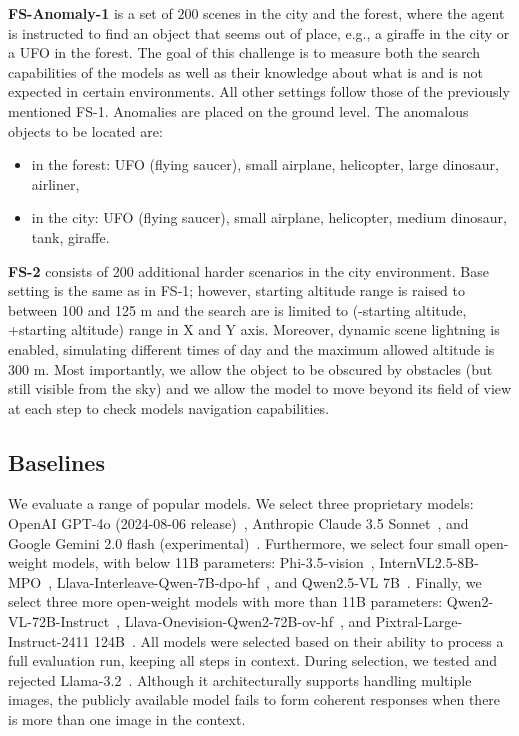 \documentclass{article}
\theoremstyle{plain}
\theoremstyle{definition}
\theoremstyle{remark}
\newcommand{\challenge}{FS-1}
\newcommand{\anomalychallenge}{FS-Anomaly-1}
\newcommand{\hardchallenge}{FS-2}
\begin{document}
\textbf{\anomalychallenge{}} is a set of $200$ scenes in the city and the forest, where the agent is instructed to find an object that seems out of place, e.g., a giraffe in the city or a UFO in the forest. The goal of this challenge is to measure both the search capabilities of the models as well as their knowledge about what is and is not expected in certain environments. All other settings follow those of the previously mentioned \challenge{}. Anomalies are placed on the ground level. The anomalous objects to be located are:
\begin{itemize}[noitemsep,topsep=0pt]
    \item in the forest: UFO (flying saucer), small airplane, helicopter, large dinosaur, airliner,
    \item in the city: UFO (flying saucer), small airplane, helicopter, medium dinosaur, tank, giraffe.
\end{itemize}

\textbf{\hardchallenge{}} consists of 200 additional harder scenarios in the city environment. Base setting is the same as in \challenge{}; however, starting altitude range is raised to between 100 and 125 m and the search are is limited to (-starting altitude, +starting altitude) range in X and Y axis. Moreover, dynamic scene lightning is enabled, simulating different times of day and the maximum allowed altitude is \(300\) m. Most importantly, we allow the object to be obscured by obstacles (but still visible from the sky) and we allow the model to move beyond its field of view at each step to check models navigation capabilities.


\subsection{Baselines}
\label{sec:supported-models} We evaluate a range of popular models. We select three proprietary models: OpenAI GPT-4o (2024-08-06 release)~\cite{achiam2023gpt,hurst2024gpt}, Anthropic Claude 3.5 Sonnet~\cite{Anthropic_2024}, and Google Gemini 2.0 flash (experimental)~\cite{Google_2024,team2024gemini}. Furthermore, we select four small open-weight models, with below 11B parameters: Phi-3.5-vision~\cite{abdin2024phi3technicalreporthighly}, InternVL2.5-8B-MPO~\cite{wang2024enhancingreasoningabilitymultimodal}, Llava-Interleave-Qwen-7B-dpo-hf~\cite{li2024llavanextinterleavetacklingmultiimagevideo}, and Qwen2.5-VL 7B~\cite{bai2025qwen2}. Finally, we select three more open-weight models with more than 11B parameters: Qwen2-VL-72B-Instruct~\cite{Qwen2VL}, 
Llava-Onevision-Qwen2-72B-ov-hf~\cite{li2024llavaonevisioneasyvisualtask}, and Pixtral-Large-Instruct-2411 124B~\cite{Mistral_2025}. All models were selected based on their ability to process a full evaluation run, keeping all steps in context. During selection, we tested and rejected Llama-3.2~\cite{llama32}. Although it architecturally supports handling multiple images, the publicly available model fails to form coherent responses when there is more than one image in the context.
\end{document}
